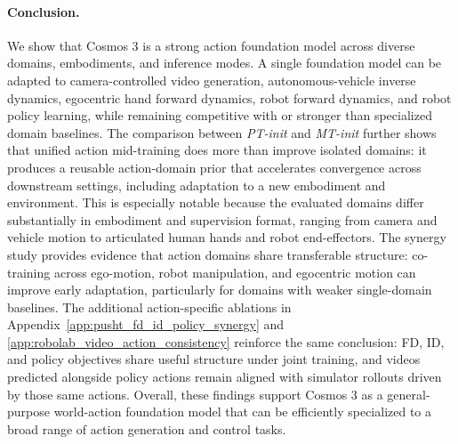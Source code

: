 


\paragraph{Conclusion.}
\label{sec:action_exp_summary}
We show that Cosmos 3 is a strong action foundation model across diverse domains, embodiments, and inference modes.
A single foundation model can be adapted to camera-controlled video generation, autonomous-vehicle inverse dynamics, egocentric hand forward dynamics, robot forward dynamics, and robot policy learning, while remaining competitive with or stronger than specialized domain baselines.
The comparison between \textit{PT-init} and \textit{MT-init} further shows that unified action mid-training does more than improve isolated domains: it produces a reusable action-domain prior that accelerates convergence across downstream settings, including adaptation to a new embodiment and environment.
This is especially notable because the evaluated domains differ substantially in embodiment and supervision format, ranging from camera and vehicle motion to articulated human hands and robot end-effectors.
The synergy study provides evidence that action domains share transferable structure: co-training across ego-motion, robot manipulation, and egocentric motion can improve early adaptation, particularly for domains with weaker single-domain baselines.
The additional action-specific ablations in Appendix~\ref{app:pusht_fd_id_policy_synergy} and \ref{app:robolab_video_action_consistency} reinforce the same conclusion: FD, ID, and policy objectives share useful structure under joint training, and videos predicted alongside policy actions remain aligned with simulator rollouts driven by those same actions.
Overall, these findings support Cosmos 3 as a general-purpose world-action foundation model that can be efficiently specialized to a broad range of action generation and control tasks.
